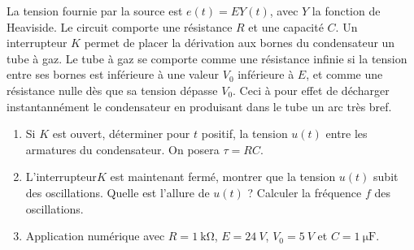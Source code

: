 	\begin{exercice}
		La tension fournie par la source est \(e(t) = E Y(t)\), avec \(Y\) la fonction de Heaviside. Le circuit comporte une résistance \(R\) et une capacité \(C\). Un interrupteur \(K\) permet de placer la dérivation aux bornes du condensateur un tube à gaz. Le tube à gaz se comporte comme une résistance infinie si la tension entre ses bornes est inférieure à une valeur \(V_0\) inférieure à \(E\), et comme une résistance nulle dès que sa tension dépasse \(V_0\). Ceci à pour effet de décharger instantannément le condensateur en produisant dans le tube un arc très bref.

		\begin{enumerate}
			\item Si \(K\) est ouvert, déterminer pour \(t\) positif, la tension \(u(t)\) entre les armatures du condensateur. On posera \(\tau = RC\).
			\item L'interrupteur$K$ est maintenant fermé, montrer que la tension \(u(t)\) subit des oscillations. Quelle est l'allure de \(u(t)\) ? Calculer la fréquence \(f\) des oscillations.
			\item Application numérique avec \(R=\SI{1}{\kilo\ohm}\), \(E=\SI{24}{V}\), \(V_0=\SI{5}{V}\) et \(C=\SI{1}{\micro\farad}\).
		\end{enumerate}
	\end{exercice}
